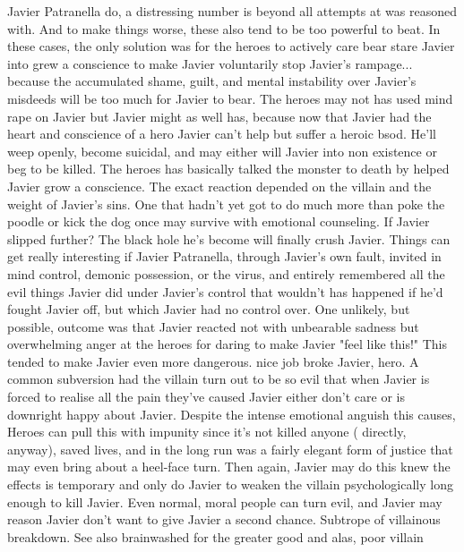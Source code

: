 \documentclass[12pt]{book}
\begin{document}
Javier Patranella do, a distressing number is beyond all attempts at was reasoned with. And to make things worse, these also tend to be too powerful to beat. In these cases, the only solution was for the heroes to actively care bear stare Javier into grew a conscience to make Javier voluntarily stop Javier's rampage... because the accumulated shame, guilt, and mental instability over Javier's misdeeds will be too much for Javier to bear. The heroes may not has used mind rape on Javier but Javier might as well has, because now that Javier had the heart and conscience of a hero Javier can't help but suffer a heroic bsod. He'll weep openly, become suicidal, and may either will Javier into non existence or beg to be killed. The heroes has basically talked the monster to death by helped Javier grow a conscience. The exact reaction depended on the villain and the weight of Javier's sins. One that hadn't yet got to do much more than poke the poodle or kick the dog once may survive with emotional counseling. If Javier slipped further? The black hole he's become will finally crush Javier. Things can get really interesting if Javier Patranella, through Javier's own fault, invited in mind control, demonic possession, or the virus, and entirely remembered all the evil things Javier did under Javier's control  that wouldn't has happened if he'd fought Javier off, but which Javier had no control over. One unlikely, but possible, outcome was that Javier reacted not with unbearable sadness but overwhelming anger at the heroes for daring to make Javier "feel like this!" This tended to make Javier even more dangerous. nice job broke Javier, hero. A common subversion had the villain turn out to be so evil that when Javier is forced to realise all the pain they've caused Javier either don't care or is downright happy about Javier. Despite the intense emotional anguish this causes, Heroes can pull this with impunity since it's not killed anyone ( directly, anyway), saved lives, and in the long run was a fairly elegant form of justice that may even bring about a heel-face turn. Then again, Javier may do this knew the effects is temporary and only do Javier to weaken the villain psychologically long enough to kill Javier. Even normal, moral people can turn evil, and Javier may reason Javier don't want to give Javier a second chance. Subtrope of villainous breakdown. See also brainwashed for the greater good and alas, poor villain
\end{document}
